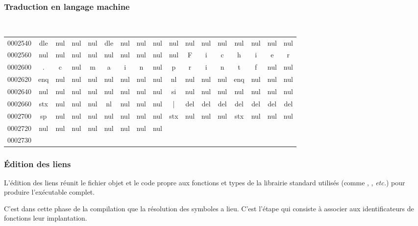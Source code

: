 \begin{frame}[fragile]
\frametitle{Traduction en langage machine}
{\tt \footnotesize
\setlength{\tabcolsep}{.07cm}
\begin{tabular}{ccccccccccccccccc}
0002540 &dle &nul &nul &nul &dle &nul &nul &nul &nul &nul &nul &nul &nul &nul &nul &nul \\
0002560 &nul &nul &nul &nul &nul &nul &nul &nul &nul &F &i &c &h &i &e &r \\
0002600 &. &c &nul &m &a &i &n &nul &p &r &i &n &t &f &nul &nul \\
0002620 &enq &nul &nul &nul &nul &nul &nul &nul &nl &nul &nul &nul &enq &nul &nul &nul \\
0002640 &nul &nul &nul &nul &nul &nul &nul &nul &si &nul &nul &nul &nul &nul &nul &nul \\
0002660 &stx &nul &nul &nul &nl &nul &nul &nul &| &del &del &del &del &del &del &del \\
0002700 &sp &nul &nul &nul &nul &nul &nul &nul &stx &nul &nul &nul &stx &nul &nul &nul \\
0002720 &nul &nul &nul &nul &nul &nul &nul &nul \\
0002730 \\
\end{tabular}}
\end{frame}

\begin{frame}[fragile]
\frametitle{Édition des liens}
L'\alert{édition des liens} réunit le fichier objet et le code propre
aux fonctions et types de la librairie standard utilisés (comme
, , {\em etc.}) pour produire l'exécutable
complet.
\bigskip

C'est dans cette phase de la compilation que la
\alert{résolution des symboles} a lieu. C'est l'étape qui consiste à
associer aux identificateurs de fonctions leur implantation.
\end{frame}

